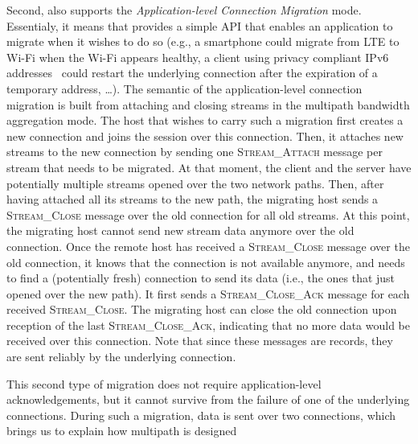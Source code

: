 Second, \tcpls also supports the \textit{Application-level Connection Migration}
mode. Essentialy, it means that \tcpls provides a simple API that enables an
application to migrate when it wishes to do so (e.g., a smartphone could migrate
from LTE to Wi-Fi when the Wi-Fi appears healthy, a client using privacy
compliant IPv6 addresses~\cite{rfc4941} could restart the underlying \tcp
connection after the expiration of a temporary address, \ldots). The semantic of
the application-level connection migration is built from attaching and closing
streams in the multipath bandwidth aggregation mode. The host that wishes to
carry such a migration first creates a new \tcp connection and joins the \tcpls
session over this connection. Then, it attaches new streams to the new
connection by sending one \textsc{Stream\_Attach} message per stream that needs
to be migrated. At that moment, the client and the server have potentially
multiple streams opened over the two network paths. Then, after having attached
all its streams to the new path, the migrating host sends a
\textsc{Stream\_Close} message over the old \tcp connection for all old streams.
At this point, the migrating host cannot send new stream data anymore over the
old connection. Once the remote host has received a \textsc{Stream\_Close}
message over the old \tcp connection, it knows that the connection is not
available anymore, and needs to find a (potentially fresh) connection to send
its data (i.e., the ones that just opened over the new path). It first sends a
\textsc{Stream\_Close\_Ack} message for each received \textsc{Stream\_Close}.
The migrating host can close the old connection upon reception of the last
\textsc{Stream\_Close\_Ack}, indicating that no more data would be received over
this connection. Note that since these messages are \tls records, they are sent
reliably by the underlying \tcp connection.

This second type of migration does not require application-level
acknowledgements, but it cannot survive from the failure of one of the
underlying connections. During such a migration, data is sent over two
connections, which brings us to explain how multipath is designed



